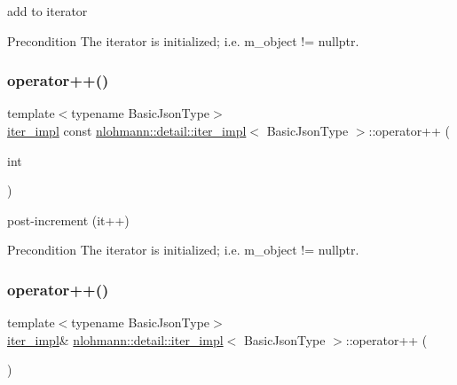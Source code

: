 add to iterator 

\begin{DoxyPrecond}{Precondition}
The iterator is initialized; i.\+e. {\ttfamily m\+\_\+object != nullptr}. 
\end{DoxyPrecond}
\mbox{\label{classnlohmann_1_1detail_1_1iter__impl_a7d2397773b2dce42f30f0375a6a1d850}} 
\subsubsection{\texorpdfstring{operator++()}{operator++()}\hspace{0.1cm}{\footnotesize\ttfamily [1/2]}}
{\footnotesize\ttfamily template$<$typename Basic\+Json\+Type$>$ \\
\mbox{\hyperlink{classnlohmann_1_1detail_1_1iter__impl}{iter\+\_\+impl}} const \mbox{\hyperlink{classnlohmann_1_1detail_1_1iter__impl}{nlohmann\+::detail\+::iter\+\_\+impl}}$<$ Basic\+Json\+Type $>$\+::operator++ (\begin{DoxyParamCaption}\item[{int}]{ }\end{DoxyParamCaption})\hspace{0.3cm}{\ttfamily [inline]}}



post-\/increment (it++) 

\begin{DoxyPrecond}{Precondition}
The iterator is initialized; i.\+e. {\ttfamily m\+\_\+object != nullptr}. 
\end{DoxyPrecond}
\mbox{\label{classnlohmann_1_1detail_1_1iter__impl_abdfe2a7f464400a7ab572782d14b922f}} 
\subsubsection{\texorpdfstring{operator++()}{operator++()}\hspace{0.1cm}{\footnotesize\ttfamily [2/2]}}
{\footnotesize\ttfamily template$<$typename Basic\+Json\+Type$>$ \\
\mbox{\hyperlink{classnlohmann_1_1detail_1_1iter__impl}{iter\+\_\+impl}}\& \mbox{\hyperlink{classnlohmann_1_1detail_1_1iter__impl}{nlohmann\+::detail\+::iter\+\_\+impl}}$<$ Basic\+Json\+Type $>$\+::operator++ (\begin{DoxyParamCaption}{ }\end{DoxyParamCaption})\hspace{0.3cm}{\ttfamily [inline]}}



